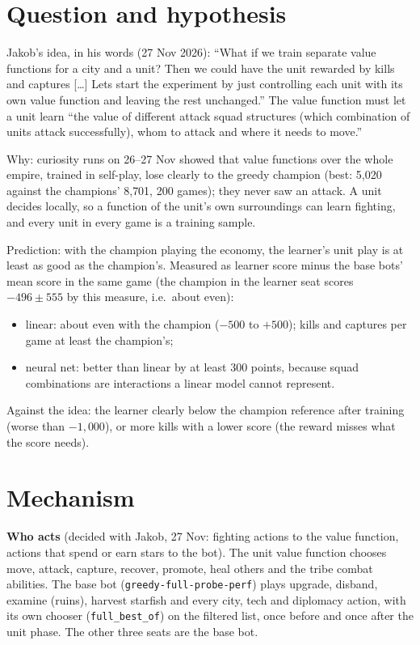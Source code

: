 \documentclass{../polyexp}
\begin{document}

\ExpHeader

\section{Question and hypothesis}
Jakob's idea, in his words (27 Nov 2026): ``What if we train separate value functions for a city and a unit? Then we
could have the unit rewarded by kills and captures [\ldots] Lets start the experiment by just controlling each unit with
its own value function and leaving the rest unchanged.'' The value function must let a unit learn ``the value of
different attack squad structures (which combination of units attack successfully), whom to attack and where it needs
to move.''

Why: curiosity runs on 26--27 Nov showed that value functions over the whole empire, trained in self-play, lose
clearly to the greedy champion (best: 5{,}020 against the champions' 8{,}701, 200 games); they never saw an attack.
A unit decides locally, so a function of the unit's own surroundings can learn fighting, and every unit in every game
is a training sample.

Prediction: with the champion playing the economy, the learner's unit play is at least as good as the champion's.
Measured as learner score minus the base bots' mean score in the same game (the champion in the learner seat scores
$-496 \pm 555$ by this measure, i.e.\ about even):
\begin{itemize}
  \item linear: about even with the champion ($-500$ to $+500$); kills and captures per game at least the champion's;
  \item neural net: better than linear by at least 300 points, because squad combinations are interactions a linear
        model cannot represent.
\end{itemize}
Against the idea: the learner clearly below the champion reference after training (worse than $-1{,}000$), or more
kills with a lower score (the reward misses what the score needs).

\section{Mechanism}
\textbf{Who acts} (decided with Jakob, 27 Nov: fighting actions to the value function, actions that spend or earn
stars to the bot). The unit value function chooses move, attack, capture, recover, promote, heal others and the tribe
combat abilities. The base bot (\texttt{greedy-full-probe-perf}) plays upgrade, disband, examine (ruins), harvest
starfish and every city, tech and diplomacy action, with its own chooser (\texttt{full\_best\_of}) on the filtered list,
once before and once after the unit phase. The other three seats are the base bot.
\end{document}
